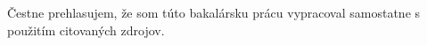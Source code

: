 \thispagestyle{empty}
\vspace*{\fill}
\hfill
\begin{minipage}{0.63\textwidth}
Čestne prehlasujem, že som túto bakalársku prácu vypracoval samostatne s použitím citovaných zdrojov.

\bigskip
	\begin{flushright}
	\begin{minipage}{0.5\textwidth}
	\dotfill
	\end{minipage}
	\end{flushright}
\end{minipage}